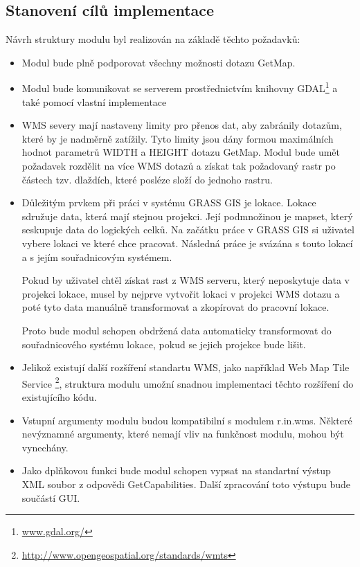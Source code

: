 \documentclass[a4paper,12pt]{article}
\begin{document}
\newpage

\subsection{Stanovení cílů implementace}

Návrh struktury modulu byl realizován na základě těchto požadavků:
\begin{itemize}
  \item Modul bude plně podporovat všechny možnosti dotazu GetMap.
  \item Modul bude komunikovat se serverem prostřednictvím knihovny GDAL\footnote{\url{www.gdal.org/}}  a také pomocí vlastní implementace 
  \item WMS severy mají nastaveny limity pro přenos dat, aby zabránily dotazům, které by je nadměrně zatížily. Tyto limity jsou dány formou maximálních hodnot parametrů WIDTH a HEIGHT dotazu GetMap. 
        Modul bude umět požadavek rozdělit na více WMS dotazů a získat tak požadovaný rastr po částech tzv. dlaždích, které posléze složí do jednoho rastru.
  \item Důležitým prvkem při práci v systému GRASS GIS je lokace. Lokace sdružuje data, která mají stejnou projekci. Její podmnožinou je mapset, který seskupuje data do logických celků. 
        Na začátku práce v GRASS GIS si uživatel vybere lokaci ve které chce pracovat. Následná práce je svázána s touto lokací a s  jejím souřadnicovým systémem.
 
        Pokud by uživatel chtěl získat rast z WMS serveru, který neposkytuje data v projekci lokace,  musel by nejprve vytvořit lokaci v projekci WMS dotazu a poté tyto data
         manuálně transformovat a zkopírovat do pracovní lokace.
	
	Proto bude modul schopen obdržená data automaticky transformovat  do souřadnicového systému lokace, pokud se jejich projekce bude lišit. 
  \item Jelikož existují další rozšíření standartu WMS, jako například Web Map Tile Service \footnote{\url{http://www.opengeospatial.org/standards/wmts}}, struktura modulu umožní snadnou implementaci 
        těchto rozšíření do existujícího kódu. 
  \item Vstupní argumenty modulu budou kompatibilní s modulem r.in.wms. Některé nevýznamné argumenty, které nemají vliv na funkčnost modulu, mohou být vynechány.
  \item Jako dplňkovou funkci bude modul schopen vypsat  na standartní výstup XML soubor z odpovědi GetCapabilities. Další zpracování toto výstupu bude součástí GUI.  
 \end{itemize}
\end{document}
